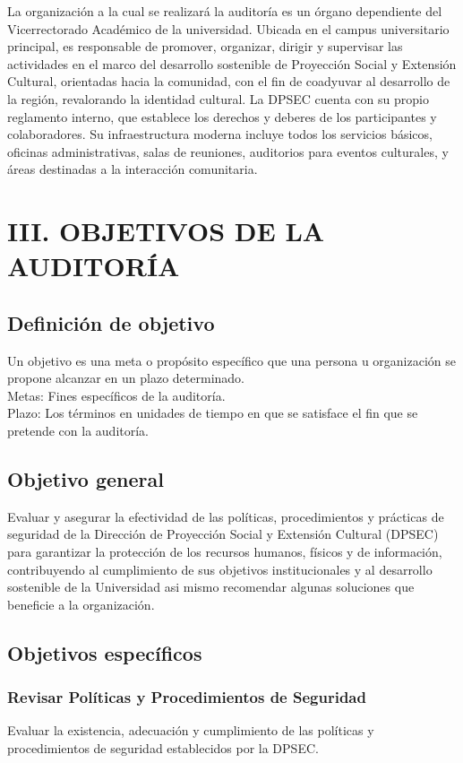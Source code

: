 \documentclass[12pt,a4paper]{article}
\begin{document}
La organización a la cual se realizará la auditoría es un órgano dependiente del Vicerrectorado Académico de la universidad. Ubicada en el campus universitario principal, es responsable de promover, organizar, dirigir y supervisar las actividades en el marco del desarrollo sostenible de Proyección Social y Extensión Cultural, orientadas hacia la comunidad, con el fin de coadyuvar al desarrollo de la región, revalorando la identidad cultural.
\espacio
La DPSEC cuenta con su propio reglamento interno, que establece los derechos y deberes de los participantes y colaboradores. Su infraestructura moderna incluye todos los servicios básicos, oficinas administrativas, salas de reuniones, auditorios para eventos culturales, y áreas destinadas a la interacción comunitaria.

\newpage
\section{III. OBJETIVOS DE LA AUDITORÍA}
\subsection{Definición de objetivo}
Un objetivo es una meta o propósito específico que una persona u organización se propone alcanzar en un plazo determinado.
\\
Metas: Fines específicos de la auditoría.
\\
Plazo: Los términos en unidades de tiempo en que se satisface el fin que se
pretende con la auditoría.


\subsection*{Objetivo general}
Evaluar y asegurar la efectividad de las políticas, procedimientos y prácticas de seguridad de la Dirección de Proyección Social y Extensión Cultural (DPSEC) para garantizar la protección de los recursos humanos, físicos y de información, contribuyendo al cumplimiento de sus objetivos institucionales y al desarrollo sostenible de la Universidad asi mismo recomendar algunas soluciones que beneficie a la organización.

\subsection*{Objetivos específicos}
\subsubsection*{Revisar Políticas y Procedimientos de Seguridad} Evaluar la existencia, adecuación y cumplimiento de las políticas y procedimientos de seguridad establecidos por la DPSEC.
\end{document}
